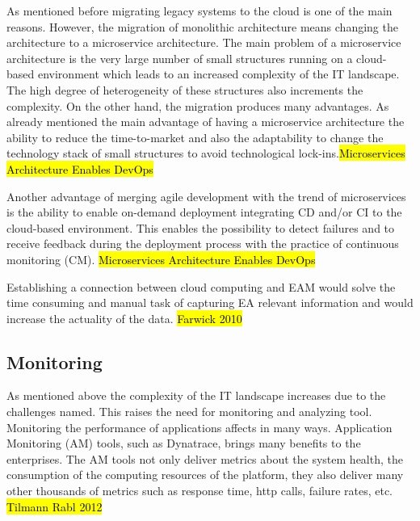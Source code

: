 As mentioned before migrating legacy systems to the cloud is one of the main reasons. However, the migration of monolithic architecture means changing the architecture to a microservice architecture. The main problem of a microservice architecture is the very large number of small structures running on a cloud-based environment which leads to an increased complexity of the IT landscape. The high degree of heterogeneity of these structures also increments the complexity.
On the other hand, the migration produces many advantages.
As already mentioned the main advantage of having a microservice architecture the ability to reduce the time-to-market and also the adaptability to change the technology stack of small structures to avoid technological lock-ins.\hl{Microservices Architecture Enables DevOps}

Another advantage of merging agile development with the trend of microservices is the ability to enable on-demand deployment integrating CD and/or CI to the cloud-based environment. This enables the possibility to detect failures and to receive feedback during the deployment process with the practice of continuous monitoring (CM). \hl{Microservices Architecture Enables DevOps}

Establishing a connection between cloud computing and EAM would solve the time consuming and manual task of capturing EA relevant information and would increase the actuality of the data. \hl{Farwick 2010}

\subsection{Monitoring}

As mentioned above the complexity of the IT landscape increases due to the challenges named. This raises the need for monitoring and analyzing tool. Monitoring the performance of applications affects in many ways. Application Monitoring (AM) tools, such as Dynatrace, brings many benefits to the enterprises. The AM tools not only deliver metrics about the system health, the consumption of the computing resources of the platform, they also deliver many other thousands of metrics such as response time, http calls, failure rates, etc. \hl{Tilmann Rabl 2012}

